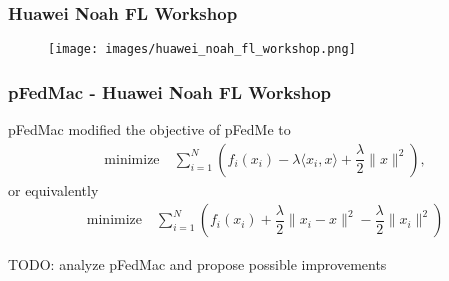 




\begin{frame}
\frametitle{Huawei Noah FL Workshop}

\begin{figure}
    \centering
    \texttt{[image: images/huawei\_noah\_fl\_workshop.png]}
\end{figure}

\end{frame}


\begin{frame}
\frametitle{pFedMac - Huawei Noah FL Workshop}

pFedMac\cite{li2021pfedmac} modified the objective of pFedMe to
\begin{align*}
    & \text{minimize} \quad \sum\limits_{i=1}^N \left( f_i(x_i) - \lambda\langle x_i, x \rangle + \dfrac{\lambda}{2} \lVert x \rVert^2 \right),
\end{align*}
or equivalently
\begin{align*}
    & \text{minimize} \quad \sum\limits_{i=1}^N \left( f_i(x_i) + \dfrac{\lambda}{2} \lVert x_i-x \rVert^2 - \dfrac{\lambda}{2} \lVert x_i \rVert^2 \right)
\end{align*}

{\color{red}TODO: analyze pFedMac and propose possible improvements}


\end{frame}

